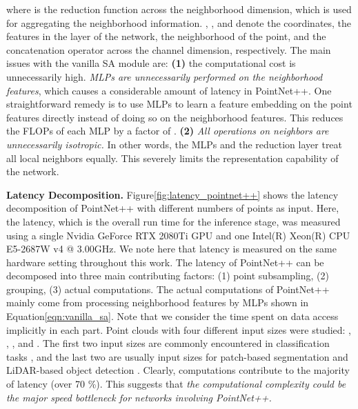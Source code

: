 \documentclass{article}
\newcommand{\figLabel}{Figure\xspace}
\newcommand{\eqnLabel}{Equation\xspace}
\newcommand{\mysection}[1]{\vspace{3pt}\noindent\textbf{#1.}}
\begin{document}
where  is the reduction function across the neighborhood dimension, which is used for aggregating the neighborhood information. , ,   and  denote the coordinates, the features in the  layer of the network, the neighborhood of the  point, and the concatenation operator across the channel dimension, respectively. 
The main issues with the vanilla SA module are: \textbf{(1)} the computational cost is unnecessarily high. \textit{MLPs are unnecessarily performed on the neighborhood features}, which causes a considerable amount of latency in PointNet++. One straightforward remedy is to use MLPs to learn a feature embedding on the point features directly instead of doing so on the neighborhood features. This reduces the FLOPs of each MLP by a factor of . \textbf{(2)} \textit{All operations on neighbors are unnecessarily isotropic.} In other words, the MLPs and the reduction layer treat all local neighbors equally. This severely limits the representation capability of the network. 

\mysection{Latency Decomposition} \figLabel\ref{fig:latency_pointnet++} shows the latency decomposition of PointNet++  \cite{Qi2017PointNetDH} with different numbers of points as input. Here, the latency, which is the overall run time for the inference stage, was measured using a single Nvidia GeForce RTX 2080Ti GPU and one Intel(R) Xeon(R) CPU E5-2687W v4 @ 3.00GHz. We note here that latency is measured on the same hardware setting throughout this work. 
The latency of PointNet++ can be decomposed into three main contributing factors: (1) point subsampling, (2) grouping, (3) actual computations. The actual computations of PointNet++ mainly come from processing neighborhood features by MLPs shown in \eqnLabel \ref{eqn:vanilla_sa}. Note that we consider the time spent on data access implicitly in each part. Point clouds with four different input sizes were studied: , , , and . The first two input sizes are commonly encountered in classification tasks \cite{ben20183dmfv}, and the last two are usually input sizes for patch-based segmentation \cite{Qi2017PointNetDH, Thomas2019KPConvFA} and LiDAR-based object detection \cite{Shi2019PointRCNN3O}. 
Clearly, computations contribute to the majority of latency (over 70 \%). This suggests that \textit{the computational complexity could be the major speed bottleneck for networks involving PointNet++. }
\end{document}
